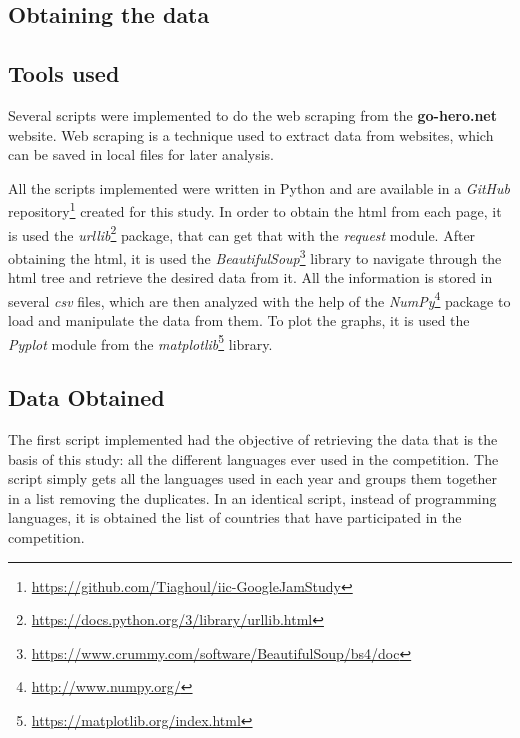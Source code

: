 \documentclass{article}
\begin{document}
\begin{multicols*}{2}

\section{Obtaining the data}

\subsection{Tools used}

Several scripts were implemented to do the web scraping from the \textbf{go-hero.net} website. Web scraping is a technique used to extract data from websites\cite{web_sc}, which can be saved in local files for later analysis.  %

All the scripts implemented were written in Python and are available in a \textit{GitHub} repository\footnote{\url{https://github.com/Tiaghoul/iic-GoogleJamStudy}} created for this study. In order to obtain the html from each page, it is used the \textit{urllib}\footnote{\url{https://docs.python.org/3/library/urllib.html}} package, that can get that with the \textit{request} module. After obtaining the html, it is used the \textit{BeautifulSoup}\footnote{\url{https://www.crummy.com/software/BeautifulSoup/bs4/doc}} library to navigate through the html tree and retrieve the desired data from it. All the information is stored in several \textit{csv} files, which are then analyzed with the help of the \textit{NumPy}\footnote{\url{http://www.numpy.org/}} package to load and manipulate the data from them. To plot the graphs, it is used the \textit{Pyplot} module from the \textit{matplotlib}\footnote{\url{https://matplotlib.org/index.html}} library.


\subsection{Data Obtained}

The first script implemented had the objective of retrieving the data that is the basis of this study: all the different languages ever used in the competition. The script simply gets all the languages used in each year and groups them together in a list removing the duplicates. In an identical script, instead of programming languages, it is obtained the list of countries that have participated in the competition.


\end{multicols*}
\end{document}
